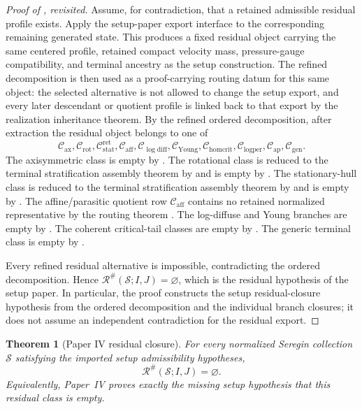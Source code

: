 \documentclass[11pt]{amsart}
\numberwithin{equation}{section}
\theoremstyle{plain}
\newtheorem{theorem}{Theorem}[section]
\theoremstyle{definition}
\theoremstyle{remark}
\newcommand{\calS}{\mathcal S}
\newcommand{\calR}{\mathcal R}
\newcommand{\Cax}{\mathcal C_{\mathrm{ax}}}
\newcommand{\Crot}{\mathcal C_{\mathrm{rot}}}
\newcommand{\Cstat}{\mathcal C_{\mathrm{stat}}^{\mathrm{ret}}}
\newcommand{\Caff}{\mathcal C_{\mathrm{aff}}}
\newcommand{\Cgen}{\mathcal C_{\mathrm{gen}}}
\newcommand{\Chomcrit}{\mathcal C_{\mathrm{homcrit}}}
\newcommand{\Clogper}{\mathcal C_{\mathrm{logper}}}
\newcommand{\Capcrit}{\mathcal C_{\mathrm{ap}}}
\newcommand{\Cyoung}{\mathcal C_{\mathrm{Young}}}
\newcommand{\Clogdiff}{\mathcal C_{\log\mathrm{diff}}}
\begin{document}
\begin{proof}[Proof of , revisited]
Assume, for contradiction, that a retained admissible residual profile exists.
Apply the setup-paper export interface to the corresponding remaining
generated state.  This produces a fixed residual object carrying the same
centered profile, retained compact velocity mass, pressure-gauge compatibility,
and terminal ancestry as the setup construction.  The refined decomposition is
then used as a proof-carrying routing datum for this same object: the selected
alternative is not allowed to change the setup export, and every later
descendant or quotient profile is linked back to that export by the realization
inheritance theorem.  By the refined ordered decomposition, after extraction
the residual object belongs to one of
\[
   \Cax,\Crot,\Cstat,\Caff,\Clogdiff,\Cyoung,
   \Chomcrit,\Clogper,\Capcrit,\Cgen .
\]
The axisymmetric class is empty by .  The rotational
class is reduced to the terminal stratification assembly theorem by  and
is empty by .  The stationary-hull class is reduced to
the terminal stratification assembly theorem by
 and is
empty by .  The affine/parasitic quotient row
\(\Caff\) contains no retained normalized representative by the routing theorem
.  The
log-diffuse and Young branches are empty by
.  The
coherent critical-tail classes are empty by
.  The generic terminal class
is empty by .

Every refined residual alternative is impossible, contradicting the ordered
decomposition.  Hence
\(\calR^\#(\calS;I,J)=\varnothing\), which is the residual hypothesis of the
setup paper.  In particular, the proof constructs the setup residual-closure
hypothesis from the ordered decomposition and the individual branch closures;
it does not assume an independent contradiction for the residual export.
\end{proof}

\begin{theorem}[Paper IV residual closure]
\label{thm:paperIV-residual-closure}
For every normalized Seregin collection \(\calS\) satisfying the imported setup
admissibility hypotheses,
\[
   \calR^\#(\calS;I,J)=\varnothing .
\]
Equivalently, Paper~IV proves exactly the missing setup hypothesis
that this residual class is empty.
\end{theorem}
\end{document}
